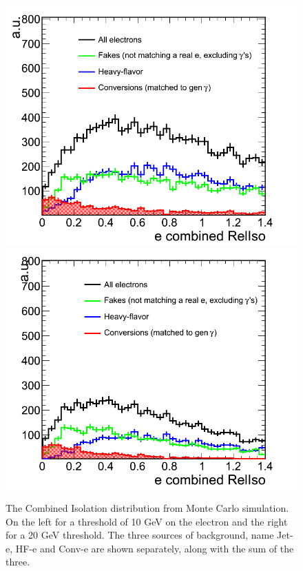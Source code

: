 \begin{figure}[h!]
\centering
\includegraphics[scale=0.28]{Plots/combIso_pt10_MC.png}
\includegraphics[scale=0.28]{Plots/combIso_pt20_MC.png}
\caption{The Combined Isolation distribution from Monte Carlo simulation.  On the left for a threshold of 10 GeV on the electron and the right for a 20 GeV threshold.  The three sources of background, name Jet-e, HF-e and Conv-e are shown separately, along with the sum of the three.}\label{fig:combIso_MC}
\end{figure}


